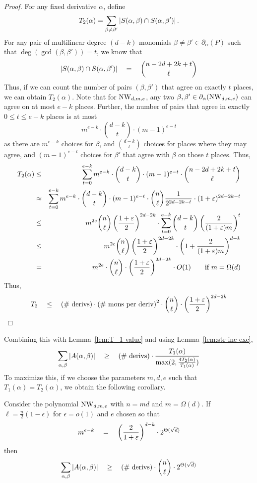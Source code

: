 \begin{proof}
For any fixed derivative $\alpha$, define \[T_2(\alpha) = \sum_{\beta\neq \beta'}\left|S(\alpha, \beta)\cap S(\alpha, \beta')\right|.\] 
For any pair of multilinear degree $(d-k)$ monomials $\beta \neq \beta' \in \partial_\alpha(P)$ such that $\deg(\gcd(\beta, \beta')) = t$, we know that 
\[
\left|S(\alpha, \beta)\cap S(\alpha, \beta')\right| \quad = \quad \binom{n - 2d + 2k +t}{\ell}
\]
Thus, if we can count the number of pairs $(\beta, \beta')$ that agree on exactly $t$ places, we can obtain $T_2(\alpha)$. Note that for $\mathrm{NW}_{d,m,e}$, any two $\beta, \beta' \in\partial_\alpha(\mathrm{NW}_{d,m,e})$ can agree on at most $e-k$ places. Further, the number of pairs that agree in exactly $0\leq t\leq e-k$ places is at most
\[
m^{e-k} \cdot \binom{d-k}{t} \cdot (m-1)^{e-t}
\]
as there are $m^{e-k}$ choices for $\beta$, and $\binom{d-k}{t}$ choices for places where they may agree, and $(m-1)^{e-t}$ choices for $\beta'$ that agree with $\beta$ on those $t$ places. Thus,
\begin{eqnarray*}
T_2(\alpha) &\leq& \sum_{t=0}^{e-k} m^{e-k} \cdot \binom{d-k}{t} \cdot (m-1)^{e-t} \cdot  \binom{n - 2d + 2k +t}{\ell}\\
& \approx  & \sum_{t=0}^{e-k} m^{e-k} \cdot \binom{d-k}{t} \cdot (m-1)^{e-t} \cdot  \binom{n}{\ell} \frac{1}{2^{2d-2k -t}}\cdot (1+\varepsilon)^{2d - 2k - t}\\
& \leq & m^{2e}\binom{n}{\ell}\left(\frac{1+\varepsilon}{2}\right)^{2d -2k}\cdot\sum_{t=0}^{e-k}\binom{d-k}{t}\left(\frac{2}{(1+\varepsilon)m}\right)^t\\
& \leq & m^{2e}\binom{n}{\ell}\left(\frac{1+\varepsilon}{2}\right)^{2d -2k}\cdot \left(1+\frac{2}{(1+\varepsilon)m}\right)^{d-k}\\
& = & m^{2e}\cdot \binom{n}{\ell} \cdot \left(\frac{1+\varepsilon}{2}\right)^{2d -2k}\cdot O(1) \qquad\text{if $m = \Omega(d)$}
\end{eqnarray*}
Thus,
\[
T_2 \quad \leq \quad\text{(\# derivs)} \cdot \text{(\# mons per deriv)}^2\cdot \binom{n}{\ell} \cdot \left(\frac{1+\varepsilon}{2}\right)^{2d -2k}
\]
\end{proof}
Combining this with Lemma~\ref{lem:T_1-value} and using Lemma~\ref{lem:str-inc-exc},
\[
\sum_{\alpha,\beta}\left|A(\alpha, \beta)\right| \quad \geq \quad \text{(\# derivs)}\cdot \frac{T_1(\alpha)}{\max(2, \frac{4T_2(\alpha)}{T_1(\alpha)})}
\]
To maximize this, if we choose the parameters $m,d,e$ such that $T_1(\alpha) = T_2(\alpha)$, we obtain the following corollary. 
\begin{corollary}\label{cor:T2-bound}
Consider the polynomial $\mathrm{NW}_{d,m,e}$ with $n = md$ and $m = \Omega(d)$. If $\ell = \frac{n}{2}(1 - \epsilon)$ for $\epsilon = o(1)$ and $e$ chosen so that
\[
m^{e-k} \quad = \quad \left(\frac{2}{1+\varepsilon}\right)^{d-k} \cdot 2^{\Theta(\sqrt{d})}
\]
then
\[
\sum_{\alpha, \beta}\left|A(\alpha, \beta)\right| \quad \geq \quad \text{(\# derivs)}\cdot  \binom{n}{\ell} \cdot 2^{\Theta(\sqrt{d})}
\]
\end{corollary}
